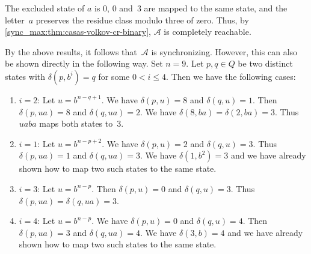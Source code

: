 \begin{example}
\begin{enumerate}
		The excluded state of $a$ is $0$, $0$ and~$3$ are mapped
		to the same state, and the letter~$a$ preserves the 
		residue class modulo three of zero. Thus, by \cref{sync_max:thm:casas-volkov-cr-binary}, 
		$\mathcal A$ is completely reachable.
		
	\end{enumerate}
	
	By the above results, it follows that~$\mathcal A$ is synchronizing.
	However, this can also be shown directly in the following way.
	Set $n = 9$. Let $p, q \in Q$ be two distinct states with $\delta(p, b^i) = q$
	for some $0 < i \le 4$.
	Then we have the following cases:
	
	\begin{enumerate}
		\item $i = 2$: Let $u = b^{n - q + 1}$.
		We have $\delta(p, u) = 8$
		and $\delta(q, u) = 1$.
		Then $\delta(p, ua) = 8$
		and $\delta(q, ua) = 2$.
		We have $\delta(8, ba) = \delta(2, ba) = 3$.
		Thus $uaba$ maps both states to~$3$.
		
		\item $i = 1$: Let $u = b^{n - p + 2}$.
		We have $\delta(p, u) = 2$
		and $\delta(q, u) = 3$.
		Thus $\delta(p, ua) = 1$
		and $\delta(q, ua) = 3$.
		We have $\delta(1, b^2) = 3$
		and we have already shown how to map
		two such states to the same state.	
		
		\item $i = 3$: Let $u = b^{n - p}$.
		Then $\delta(p, u) = 0$
		and $\delta(q, u) = 3$.
		Thus $\delta(p, ua) = \delta(q, ua) = 3$.
		
		\item $i = 4$: Let $u = b^{n - p}$.
		We have $\delta(p, u) = 0$
		and $\delta(q, u) = 4$.
		Then $\delta(p, ua) = 3$
		and $\delta(q, ua) = 4$.
		We have $\delta(3, b) = 4$
		and we have already shown how to map 
		two such states to the same state.
	\end{enumerate}
\end{example}

